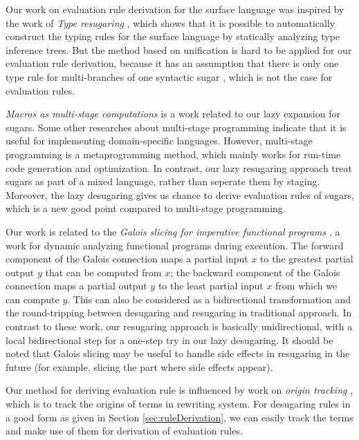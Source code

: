 Our work on evaluation rule derivation for the surface language was inspired by the work of \emph{Type resugaring} \cite{resugaringtype}, which shows that it is possible to automatically construct the typing rules for the surface language by statically analyzing type inference trees. But the method based on unification is hard to be applied for our evaluation rule derivation, because it has an assumption that there is only one type rule for multi-branches of one syntactic sugar , which is not the case for evaluation rules.


\emph{Macros as multi-stage computations} \cite{multistage} is a work related to our lazy expansion for sugars. Some other researches \cite{modularstaging} about multi-stage programming \cite{MSP} indicate that it is useful for implementing domain-specific languages. However, multi-stage programming is a metaprogramming method, which mainly works for run-time code generation and optimization. In contrast, our lazy resugaring approach treat sugars as part of a mixed language, rather than seperate them by staging. Moreover, the lazy desugaring gives us chance to derive evaluation rules of sugars, which is a new good point compared to multi-stage programming.

Our work is related to the \emph{Galois slicing for imperative functional programs} \cite{slicing}, a work for dynamic analyzing functional programs during execution. The forward component of the Galois connection maps a partial input $x$ to the greatest partial output $y$ that can be computed from $x$; the backward component of the Galois connection maps a partial output $y$ to the least partial input $x$ from which we can compute $y$.
This can also be considered as a bidirectional transformation \cite{bx,lens07} and the round-tripping between desugaring and resugaring in traditional approach. In contrast to these work, our resugaring approach is basically unidirectional, with a local bidirectional step
for a one-step try in our lazy desugaring. It should be noted that Galois slicing may be useful to handle side effects in resugaring in the future (for example, slicing the part where side effects appear).

Our method for deriving evaluation rule is influenced by work on \emph{origin tracking} \cite{origintracking}, which is to  track the origins of terms in rewriting system.
For desugaring rules in a good form as given in Section \ref{sec:ruleDerivation}, we can easily track the terms and make use of them for derivation of evaluation rules. 
%

